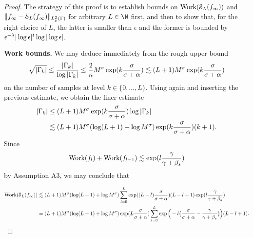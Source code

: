 \begin{proof}
	The strategy of this proof is to establish bounds on $\text{Work}(\mathcal{S}_{L}(f_{\infty}))$ and $\|f_{\infty}-\mathcal{S}_{L}(f_{\infty})\|_{L^2_{\mu}(\Gamma)}$ for arbitrary $L\in\N$ first, and then to show that, for the right choice of $L$, the latter is smaller than $\epsilon$ and the former is bounded by $\epsilon^{-\lambda}|\log\epsilon|^{t}\log|\log \epsilon|$.
	
		\textbf{Work bounds.}  We may deduce immediately from  the rough upper bound
		\begin{equation*}
		\sqrt{|\Gamma_k|}\leq\frac{|\Gamma_k|}{\log|\Gamma_k|}\leq \frac{2}{\kappa}M^{\sigma}\exp(k\frac{\sigma}{\sigma+\alpha})\lesssim (L+1)M^{\sigma}\exp(k\frac{\sigma}{\sigma+\alpha})
		\end{equation*}
		on the number of samples at level $k\in\{0,\dots,L\}$. %
		Using  again and inserting the previous estimate, we obtain the finer estimate
		\begin{equation*}
		\begin{split}
		|\Gamma_k|&\leq (L+1)M^{\sigma}\exp(k\frac{\sigma}{\sigma+\alpha})\log {|\Gamma_k|}\\
		&\lesssim (L+1)M^{\sigma}(\log (L+1)+\log M^{\sigma})\exp(k\frac{\sigma}{\sigma+\alpha})(k+1).
		\end{split}
		\end{equation*}
	Since 
	$$
	\text{Work}(f_{l})+\text{Work}(f_{l-1})\lesssim \exp(l\frac{\gamma}{\gamma+\beta_{s}})
	$$ by Assumption {A3}, we may conclude that
	
	\begin{equation}
	\label{eq:workbounds}
	\begin{split}
	\work(\smol_{L}(\rs_{\infty}))%
	&\lesssim  (L+1)M^{\dimp}(\log (L+1)+\log M^{\dimp})\sum_{l=0}^{L}\exp((L-l)\frac{\dimp}{\dimp+\alpha})(L-l+1)\exp(l\frac{\gamma}{\gamma+\sc})\\
	&=(L+1)M^{\dimp}(\log (L+1)+\log M^{\dimp})\exp(L\frac{\dimp}{\dimp+\alpha})\sum_{l=0}^{L}\exp\Big(-l\big(\frac{\dimp}{\dimp+\alpha}-\frac{\gamma}{\gamma+\sc}\big)\Big)(L-l+1).
	\end{split}
	\end{equation}
	

\end{proof}
